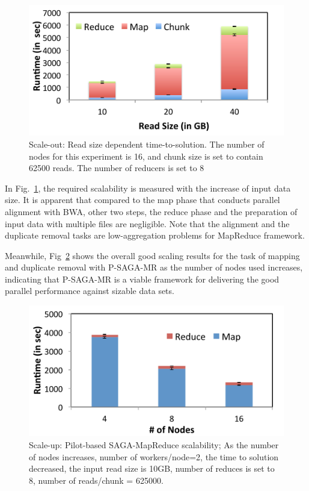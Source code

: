 \documentclass{sig-alternate}
\begin{document}
 \begin{figure}
 \centering
\includegraphics[scale=0.50]{figures/pj-smr-tts.pdf} 
\caption{\small Scale-out: Read size dependent time-to-solution.  The number of nodes for this experiment is 16, and chunk size is set to contain 62500 reads.  The number of reducers is set to 8}
  \label{fig:read-size} 
\end{figure}

 In Fig.~\ref{fig:read-size}, the required scalability is measured with the increase of input data size.  It is apparent that compared to the map phase that conducts parallel alignment with BWA, other two steps, the reduce phase and the preparation of input data with multiple files are negligible.  Note that the alignment and the duplicate removal tasks are low-aggregation problems for MapReduce framework.  

Meanwhile, Fig~\ref{fig:scale-p-saga-mr} shows the overall good scaling results for the task of mapping and duplicate removal with P-SAGA-MR as the number of nodes used increases, indicating that P-SAGA-MR is a viable framework for delivering the good parallel performance against sizable data sets.





\begin{figure}
 \centering
\includegraphics[scale=0.50]{figures/pj-smr-scale.pdf}
\caption{\small Scale-up: Pilot-based SAGA-MapReduce scalability; As the number of nodes increases, number of workers/node=2, the time to solution decreased, the input read size is 10GB, number of reduces is set to 8, number of reads/chunk = 625000. }
  \label{fig:scale-p-saga-mr} 
\end{figure}
\end{document}
